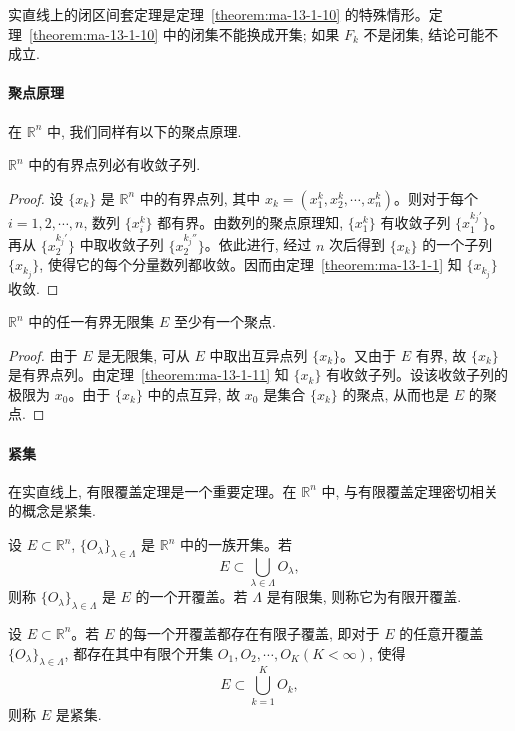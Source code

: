 实直线上的闭区间套定理是定理~\ref{theorem:ma-13-1-10} 的特殊情形。定理~\ref{theorem:ma-13-1-10} 中的闭集不能换成开集; 如果 $F_k$ 不是闭集, 结论可能不成立.

\paragraph*{聚点原理}


在 $\mathbb R^n$ 中, 我们同样有以下的聚点原理.

\begin{theorem}\label{theorem:ma-13-1-11}
$\mathbb R^n$ 中的有界点列必有收敛子列.
\end{theorem}


\begin{proof}
设 $\{x_k\}$ 是 $\mathbb R^n$ 中的有界点列, 其中 $x_k=(x_1^k,x_2^k,\cdots,x_n^k)$。则对于每个 $i=1,2,\cdots,n$, 数列 $\{x_i^k\}$ 都有界。由数列的聚点原理知, $\{x_1^k\}$ 有收敛子列 $\{x_1^{k_j'}\}$。再从 $\{x_2^{k_j'}\}$ 中取收敛子列 $\{x_2^{k_j''}\}$。依此进行, 经过 $n$ 次后得到 $\{x_k\}$ 的一个子列 $\{x_{k_j}\}$, 使得它的每个分量数列都收敛。因而由定理~\ref{theorem:ma-13-1-1} 知 $\{x_{k_j}\}$ 收敛.
\end{proof}


\begin{theorem}\label{theorem:ma-13-1-12}
$\mathbb R^n$ 中的任一有界无限集 $E$ 至少有一个聚点.
\end{theorem}


\begin{proof}
由于 $E$ 是无限集, 可从 $E$ 中取出互异点列 $\{x_k\}$。又由于 $E$ 有界, 故 $\{x_k\}$ 是有界点列。由定理~\ref{theorem:ma-13-1-11} 知 $\{x_k\}$ 有收敛子列。设该收敛子列的极限为 $x_0$。由于 $\{x_k\}$ 中的点互异, 故 $x_0$ 是集合 $\{x_k\}$ 的聚点, 从而也是 $E$ 的聚点.
\end{proof}


\paragraph*{紧集}


在实直线上, 有限覆盖定理是一个重要定理。在 $\mathbb R^n$ 中, 与有限覆盖定理密切相关的概念是紧集.

设 $E\subset\mathbb R^n$, $\{O_\lambda\}_{\lambda\in\Lambda}$ 是 $\mathbb R^n$ 中的一族开集。若
\[
  E\subset \bigcup_{\lambda\in\Lambda}O_\lambda,
\]
则称 $\{O_\lambda\}_{\lambda\in\Lambda}$ 是 $E$ 的一个开覆盖。若 $\Lambda$ 是有限集, 则称它为有限开覆盖.

\begin{definition}\label{definition:ma-13-1-8}
设 $E\subset\mathbb R^n$。若 $E$ 的每一个开覆盖都存在有限子覆盖, 即对于 $E$ 的任意开覆盖 $\{O_\lambda\}_{\lambda\in\Lambda}$, 都存在其中有限个开集 $O_1,O_2,\cdots,O_K(K<\infty)$, 使得
\[
  E\subset\bigcup_{k=1}^K O_k,
\]
则称 $E$ 是紧集.
\end{definition}

